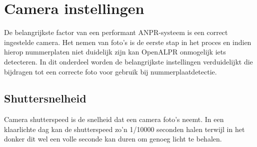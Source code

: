 \section{Camera instellingen}
De belangrijkste factor van een performant ANPR-systeem is een correct ingestelde camera. Het nemen van foto's is de eerste stap in het proces en indien hierop nummerplaten niet duidelijk zijn kan OpenALPR onmogelijk iets detecteren. In dit onderdeel worden de belangrijkste instellingen verduidelijkt die bijdragen tot een correcte foto voor gebruik bij nummerplaatdetectie.

\subsection{Shuttersnelheid}

Camera shutterspeed is de snelheid dat een camera foto's neemt. In een klaarlichte dag kan de shutterspeed zo'n 1/10000 seconden halen terwijl in het donker dit wel een volle seconde kan duren om genoeg licht te behalen. \autocite{openalprcameraplacement}

